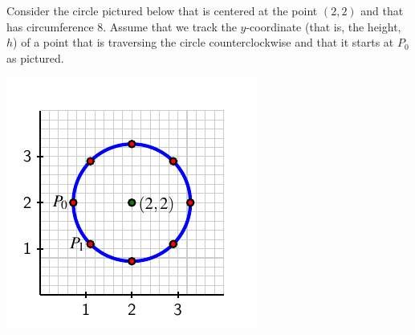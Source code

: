 \documentclass[nooutcomes, noauthor]{ximera}
\begin{document}
\begin{exploration}
Consider the circle pictured below that is centered at the point \((2,2)\) and that has circumference \(8\).  Assume that we track the \(y\)-coordinate (that is, the height, \(h\)) of a point that is traversing the circle counterclockwise and that it starts at \(P_0\) as pictured.

\begin{image}
\includegraphics{traversing-act-circle.pdf}
\end{image}


\end{exploration}
\end{document}
